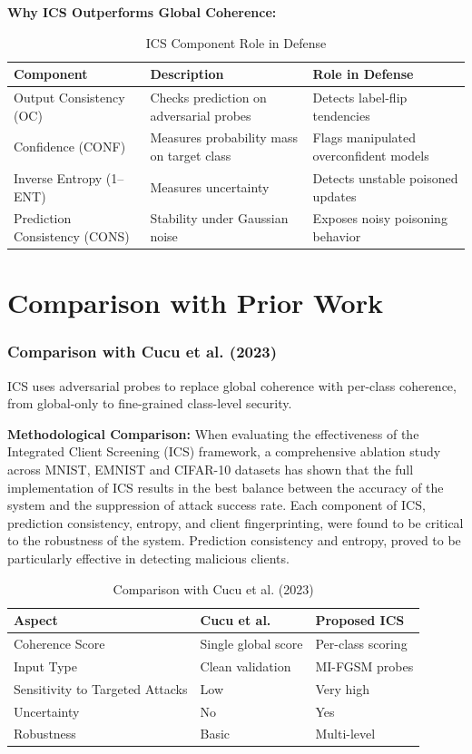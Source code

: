 \documentclass[conference]{IEEEtran}
\begin{document}
\textbf{Why ICS Outperforms Global Coherence:}

\begin{table}[t]
\centering
\caption{ICS Component Role in Defense}
\label{tab:ics_components}
\begin{tabular}{|p{2.3cm}|p{2.5cm}|p{2.3cm}|}
\hline
\textbf{Component} & \textbf{Description} & \textbf{Role in Defense} \\ \hline
Output Consistency (OC) & Checks prediction on adversarial probes & Detects label-flip tendencies \\ \hline
Confidence (CONF) & Measures probability mass on target class & Flags manipulated overconfident models \\ \hline
Inverse Entropy (1–ENT) & Measures uncertainty & Detects unstable poisoned updates \\ \hline
Prediction Consistency (CONS) & Stability under Gaussian noise & Exposes noisy poisoning behavior \\ \hline
\end{tabular}
\end{table}

\section{Comparison with Prior Work}
\label{sec:comparison}
\subsubsection{Comparison with Cucu et al. (2023)}
 ICS uses adversarial probes to replace global coherence with per-class coherence, from global-only to fine-grained class-level security. 

\textbf{Methodological Comparison:}
When evaluating the effectiveness of the Integrated Client Screening (ICS) framework, a comprehensive ablation study across MNIST, EMNIST and CIFAR-10 datasets has shown that the full implementation of ICS results in the best balance between the accuracy of the system and the suppression of attack success rate. Each component of ICS, prediction consistency, entropy, and client fingerprinting, were found to be critical to the robustness of the system. Prediction consistency and entropy, proved to be particularly effective in detecting malicious clients.
\begin{table}[h]
\centering
\caption{Comparison with Cucu et al. (2023)}
\label{tab:method_comparison}
\begin{tabular}{|p{2.3cm}|p{2.6cm}|p{2.3cm}|}
\hline
\textbf{Aspect} & \textbf{Cucu et al.} & \textbf{Proposed ICS} \\ \hline
Coherence Score & Single global score & Per-class scoring \\ \hline
Input Type & Clean validation & MI-FGSM probes \\ \hline
Sensitivity to Targeted Attacks & Low & Very high \\ \hline
Uncertainty & No & Yes \\ \hline
Robustness & Basic & Multi-level \\ \hline
\end{tabular}
\end{table}
\end{document}
